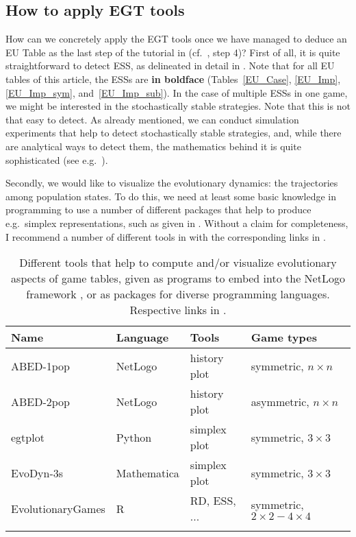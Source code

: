 \documentclass[output=paper,hidelinks]{langscibook}
\begin{document}
\subsection{How to apply EGT tools}

How can we concretely apply the EGT tools once we have managed to deduce an EU Table as the last step of the tutorial in  (cf.~, step 4)? First of all, it is quite straightforward to detect ESS, as delineated in detail in .
Note that for all EU tables of this article, the ESSs are \textbf{in boldface} (Tables~\ref{EU_Case}, \ref{EU_Imp}, \ref{EU_Imp_sym}, and~\ref{EU_Imp_sub}). In the case of multiple ESSs in one game, we might be interested in the stochastically stable strategies. Note that this is not that easy to detect. As already mentioned, we can conduct simulation experiments that help to detect stochastically stable strategies, and, while there are analytical ways to detect them, the mathematics behind it is quite sophisticated (see e.g.~\citealt[99]{Jaeger07}).

Secondly, we would like to visualize the evolutionary dynamics: the trajectories among population states. To do this, we need at least some basic knowledge in programming to use a number of different packages that help to produce e.g.~simplex representations, such as given in . Without a claim for completeness, I recommend a number of different tools in  with the corresponding links in .

\begin{table}
\begin{tabularx}{\textwidth}{Qlll} 
\lsptoprule
Name & Language & Tools & Game types\\
\midrule
ABED-1pop  & NetLogo &  history plot   & symmetric, $n\times n$ \\
ABED-2pop  & NetLogo &  history plot   & asymmetric, $n\times n$ \\
egtplot  & Python &  simplex plot   & symmetric, $3\times3$ \\
EvoDyn-3s  & Mathematica &  simplex plot  & symmetric, $3\times3$ \\
EvolutionaryGames  & R &  RD, ESS, ...  & symmetric, $2\times2-4\times4$ \\
 \lspbottomrule
\end{tabularx}
\caption{Different tools that help to compute and/or visualize evolutionary aspects of game tables, given as programs to embed into the NetLogo framework \citep{Wilensky1999}, or as packages for diverse programming languages. Respective links in .\label{tools}}
\end{table}
\end{document}
